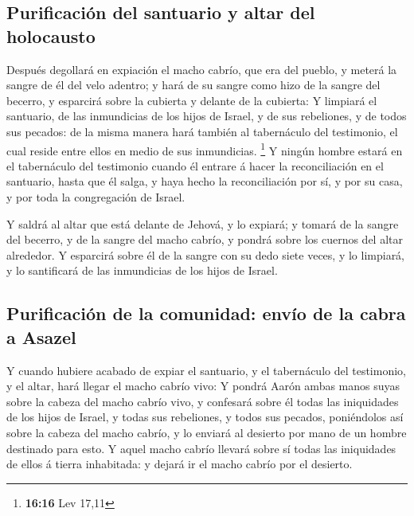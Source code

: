 \hypertarget{purificaciuxf3n-del-santuario-y-altar-del-holocausto}{%
\subsection{Purificación del santuario y altar del
holocausto}\label{purificaciuxf3n-del-santuario-y-altar-del-holocausto}}

 Después degollará en expiación el macho cabrío, que era
del pueblo, y meterá la sangre de él del velo adentro; y hará de su
sangre como hizo de la sangre del becerro, y esparcirá sobre la cubierta
y delante de la cubierta:  Y limpiará el santuario, de las
inmundicias de los hijos de Israel, y de sus rebeliones, y de todos sus
pecados: de la misma manera hará también al tabernáculo del testimonio,
el cual reside entre ellos en medio de sus inmundicias. \footnote{\textbf{16:16}
  Lev 17,11}  Y ningún hombre estará en el tabernáculo del
testimonio cuando él entrare á hacer la reconciliación en el santuario,
hasta que él salga, y haya hecho la reconciliación por sí, y por su
casa, y por toda la congregación de Israel.

 Y saldrá al altar que está delante de Jehová, y lo
expiará; y tomará de la sangre del becerro, y de la sangre del macho
cabrío, y pondrá sobre los cuernos del altar alrededor.  Y
esparcirá sobre él de la sangre con su dedo siete veces, y lo limpiará,
y lo santificará de las inmundicias de los hijos de Israel.

\hypertarget{purificaciuxf3n-de-la-comunidad-envuxedo-de-la-cabra-a-asazel}{%
\subsection{Purificación de la comunidad: envío de la cabra a
Asazel}\label{purificaciuxf3n-de-la-comunidad-envuxedo-de-la-cabra-a-asazel}}

 Y cuando hubiere acabado de expiar el santuario, y el
tabernáculo del testimonio, y el altar, hará llegar el macho cabrío
vivo:  Y pondrá Aarón ambas manos suyas sobre la cabeza del
macho cabrío vivo, y confesará sobre él todas las iniquidades de los
hijos de Israel, y todas sus rebeliones, y todos sus pecados,
poniéndolos así sobre la cabeza del macho cabrío, y lo enviará al
desierto por mano de un hombre destinado para esto.  Y
aquel macho cabrío llevará sobre sí todas las iniquidades de ellos á
tierra inhabitada: y dejará ir el macho cabrío por el desierto.

